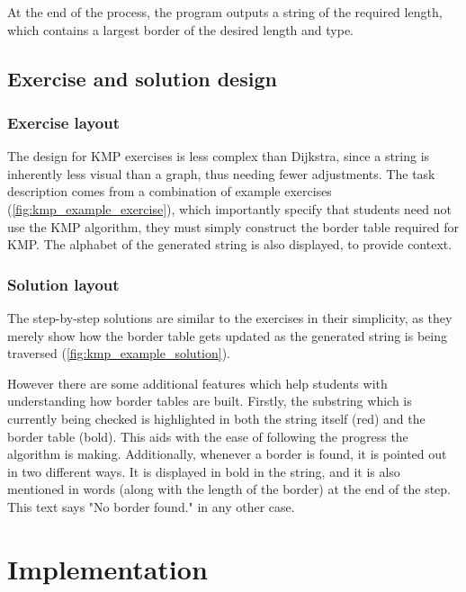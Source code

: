 \documentclass{l4proj}
\begin{document}
At the end of the process, the program outputs a string of the required length, which contains a largest border of the desired length and type.

\pagebreak

\section{Exercise and solution design}

\subsection{Exercise layout}
\label{sec:KMPExerciseDesign}

The design for KMP exercises is less complex than Dijkstra, since a string is inherently less visual than a graph, thus needing fewer adjustments. The task description comes from a combination of example exercises  (\autoref{fig:kmp_example_exercise}), which importantly specify that students need not use the KMP algorithm, they must simply construct the border table required for KMP. The alphabet of the generated string is also displayed, to provide context.

\subsection{Solution layout}
\label{sec:KMPSolutionDesign}

The step-by-step solutions are similar to the exercises in their simplicity, as they merely show how the border table gets updated as the generated string is being traversed (\autoref{fig:kmp_example_solution}).

However there are some additional features which help students with understanding how border tables are built. Firstly, the substring which is currently being checked is highlighted in both the string itself (red) and the border table (bold). This aids with the ease of following the progress the algorithm is making. Additionally, whenever a border is found, it is pointed out in two different ways. It is displayed in bold in the string, and it is also mentioned in words (along with the length of the border) at the end of the step. This text says "No border found." in any other case.

\chapter{Implementation}
\label{chap:imp}
\end{document}
